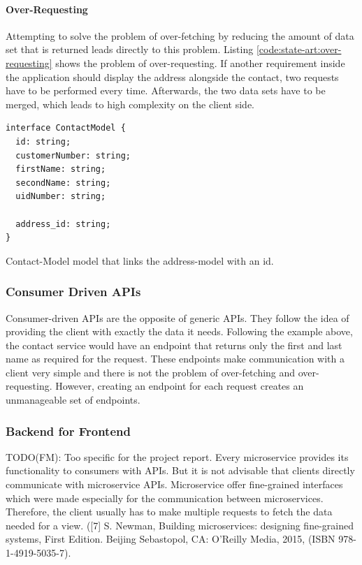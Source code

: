 \paragraph{Over-Requesting}

Attempting to solve the problem of over-fetching by reducing the amount of data set that is returned leads directly to this problem. Listing \ref{code:state-art:over-requesting} shows the problem of over-requesting. If another requirement inside the application should display the address alongside the contact, two requests have to be performed every time. Afterwards, the two data sets have to be merged, which leads to high complexity on the client side. \cite{misc:2019:leitner:backend-for-frontends}

\ifshowListings
\begin{listing}[H]
\begin{verbatim}
interface ContactModel {
  id: string;
  customerNumber: string;
  firstName: string;
  secondName: string;
  uidNumber: string;

  address_id: string;
}
\end{verbatim}
\caption{Contact-Model model that links the address-model with an id.}\label{code:state-art:over-requesting}
\end{listing}
\fi

\subsubsection{Consumer Driven APIs}

Consumer-driven APIs are the opposite of generic APIs. They follow the idea of providing the client with exactly the data it needs. Following the example above, the contact service would have an endpoint that returns only the first and last name as required for the request. These endpoints make communication with a client very simple and there is not the problem of over-fetching and over-requesting. However, creating an endpoint for each request creates an unmanageable set of endpoints. \cite{misc:2019:leitner:backend-for-frontends}

\subsubsection{Backend for Frontend}

\ifshowUnusedContent
TODO(FM): Too specific for the project report.
Every microservice provides its functionality to consumers with APIs. But it is not advisable that clients directly communicate with microservice APIs. Microservice offer fine-grained interfaces which were made especially for the communication between microservices. Therefore, the client usually has to make multiple requests to fetch the data needed for a view. ([7] S. Newman, Building microservices: designing fine-grained systems, First Edition. Beijing Sebastopol, CA: O’Reilly Media, 2015, (ISBN 978-1-4919-5035-7).

